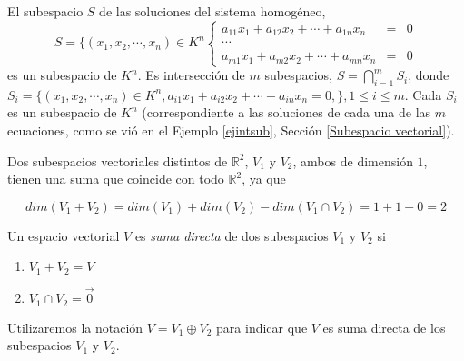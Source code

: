 \bigskip

\begin{example}
El subespacio $S$ de las soluciones del sistema homogéneo, 
\begin{equation} 
S=\{ (x_1,x_2,\cdots, x_n) \in K^n
\left\{ \begin{array} {rcl} \nonumber
               a_{11}x_1+a_{12}x_2+\cdots +a_{1n}x_n& =&0\\
               \cdots \\
                    a_{m1}x_1+a_{m2}x_2+\cdots +a_{mn}x_n& =&0
                   \end{array}
           \right.
           \label{ejsist}
\end{equation}
es un subespacio de $K^n$. Es  intersección de $m$ subespacios,  $S=\bigcap^{m}_{i=1} S_i$, donde $S_i=\{ (x_1,x_2,\cdots, x_n) \in K^n, a_{i1}x_1+a_{i2}x_2+\cdots +a_{in}x_n=0,\}, 1\leq i\leq m$. Cada $S_i$ es un subespacio de $K^n$ (correspondiente a las soluciones de cada una de las $m$ ecuaciones, como se vió en el  Ejemplo \ref{ejintsub}, Sección  \ref{Subespacio vectorial}).
\end{example}


\begin{example}



Dos subespacios vectoriales distintos de $\mathbb{R}^{2}$,  $V_1$ y $V_2$, ambos de dimensión $1$, tienen una suma que coincide con todo $\mathbb{R}^{2}$, ya que 

$$dim(V_1 +V_2)=dim(V_1)+dim(V_2)-dim(V_1 \cap V_2)=1 + 1 -0=2 $$

\end{example}


\begin{definition}


Un espacio vectorial $V$ es \textit{suma directa} de dos subespacios $V_1$ y $V_2$ si 

\begin{enumerate}

\item $V_1 +V_2=V$

\item $V_1 \cap V_2={\vec{0}}$



\end{enumerate}
\end{definition}
Utilizaremos la notación $V=V_1 \oplus V_2$ para indicar que $V$ es suma directa de los subespacios $V_1$ y $V_2$.


